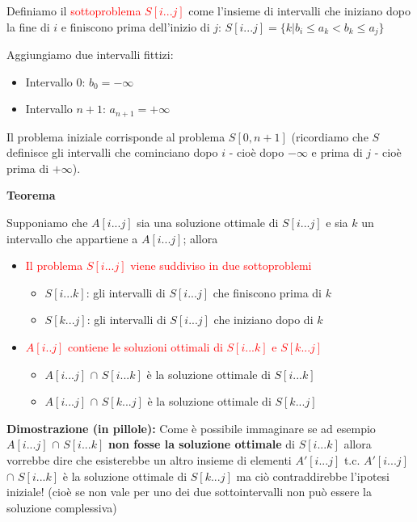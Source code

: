 \documentclass[../cheatSheetAlgoritmi.tex]{subfiles}
\begin{document}
Definiamo il \textcolor{red}{sottoproblema $S[i...j]$} come l'insieme di intervalli che iniziano dopo la fine di $i$ e finiscono prima dell'inizio di $j$: $S[i...j] = \{k|b_i \leq a_k < b_k \leq a_j\}$

Aggiungiamo due intervalli fittizi:

\begin{itemize}
	\item  Intervallo 0: $b_0 = - \infty$ 
	\item  Intervallo $n+1$: $a_{n+1} = + \infty$ 
\end{itemize}
Il problema iniziale corrisponde al problema $S[0,n+1]$ (ricordiamo che $S$ definisce gli intervalli che cominciano dopo $i$ - cioè dopo $- \infty$ e prima di $j$ - cioè prima di $+ \infty$).
 
\begin{flushleft}
\textbf{Teorema}
\end{flushleft}
Supponiamo che $A[i...j]$ sia una soluzione ottimale di $S[i...j]$ e sia $k$ un intervallo che appartiene a $A[i...j]$; allora
\begin{itemize}
	\item  \textcolor{red}{Il problema $S[i...j]$ viene suddiviso in due sottoproblemi}
		\begin{itemize}
			\item  $S[i...k]$: gli intervalli di $S[i...j]$ che finiscono prima di $k$
			\item  $S[k...j]$: gli intervalli di $S[i...j]$ che iniziano dopo di $k$ 
		\end{itemize}
	\item  \textcolor{red}{$A[i..j]$ contiene le soluzioni ottimali di $S[i...k]$ e $S[k...j]$} 
		\begin{itemize}
			\item  $A[i...j]$ $\cap$ $S[i...k]$ è la soluzione ottimale di $S[i...k]$
			\item  $A[i...j]$ $\cap$ $S[k...j]$ è la soluzione ottimale di $S[k...j]$
		\end{itemize}
\end{itemize}
\textbf{Dimostrazione (in pillole):} Come è possibile immaginare se ad esempio $A[i...j]$ $\cap$ $S[i...k]$ \textbf{non fosse la soluzione ottimale} di $S[i...k]$ allora vorrebbe dire che esisterebbe un altro insieme di elementi $A'[i...j]$ t.c. $A'[i...j]$ $\cap$ $S[i...k]$ è la soluzione ottimale di $S[k...j]$ ma ciò contraddirebbe l'ipotesi iniziale! (cioè se non vale per uno dei due sottointervalli non può essere la soluzione complessiva)
\end{document}
